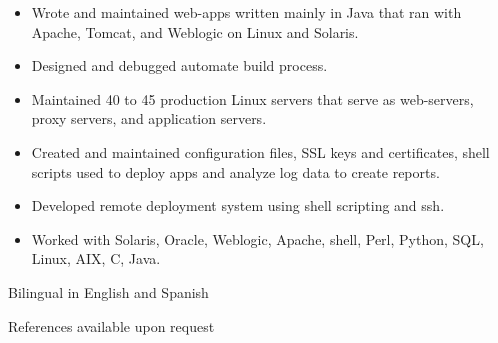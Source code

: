 \documentclass{res}
\begin{document}
\begin{resume}
\begin{itemize}
\item Wrote and maintained web-apps written mainly in Java that ran with
Apache, Tomcat, and Weblogic on Linux and Solaris.

\item Designed and debugged automate build process.

\item Maintained 40 to 45 production Linux servers that serve as
web-servers, proxy servers, and application servers.

\item Created and maintained configuration files, SSL keys and
certificates, shell scripts used to deploy apps and analyze log data to
create reports.

\item Developed remote deployment system using shell scripting and ssh.

\item  Worked with Solaris, Oracle, Weblogic, Apache, shell, Perl,
Python, SQL, Linux, AIX, C, Java.

\end{itemize}


Bilingual in English and Spanish

References available upon request

\end{resume}
\end{document}
